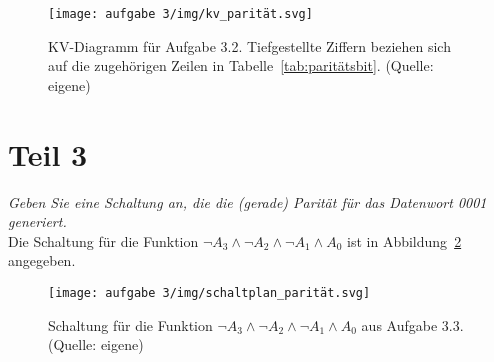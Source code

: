 \begin{figure}
    \centering
    \texttt{[image: aufgabe 3/img/kv\_parität.svg]}
    \caption{KV-Diagramm für Aufgabe 3.2. Tiefgestellte Ziffern beziehen sich auf die zugehörigen Zeilen in Tabelle~\ref{tab:paritätsbit}.  (Quelle: eigene)}
    \label{fig:kv_parität}
\end{figure}

\section{Teil 3}

\textit{Geben Sie eine Schaltung an, die die (gerade) Parität für das Datenwort  0001 generiert.}\\

\noindent
Die Schaltung für die Funktion $\neg A_3 \land \neg A_2 \land \neg A_1 \land A_0$ ist in Abbildung~\ref{fig:schaltplan_parität} angegeben.

\begin{figure}
    \centering
    \texttt{[image: aufgabe 3/img/schaltplan\_parität.svg]}
    \caption{Schaltung für die Funktion $\neg A_3 \land \neg A_2 \land \neg A_1 \land A_0$ aus Aufgabe 3.3.  (Quelle: eigene)}
    \label{fig:schaltplan_parität}
\end{figure}
